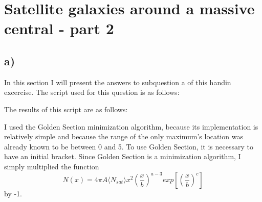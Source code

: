 \section{Satellite galaxies around a massive central - part 2}
\subsection*{a)}
In this section I will present the answers to subquestion a of this handin excercise. The script used for this question is as follows:

The results of this script are as follows:

I used the Golden Section minimization algorithm, because its implementation is relatively simple and because the range of the only maximum's location was already known to be between 0 and 5. To use Golden Section, it is necessary to have an initial bracket. Since Golden Section is a minimization algorithm, I simply multiplied the function 
\begin{equation}
    N(x) = 4\pi A \langle N_{sat} \rangle x^2 \left(\frac{x}{b}\right)^{a-3}exp[\left(\frac{x}{b}\right)^c]
\end{equation}
by -1.
